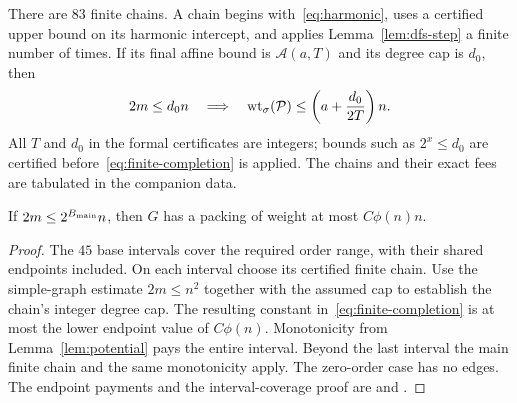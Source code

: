 There are $83$ finite chains. A chain begins with~\eqref{eq:harmonic}, uses
a certified upper bound on its harmonic intercept, and applies
Lemma~\ref{lem:dfs-step} a finite number of times. If its final affine bound
is $\mathcal A(a,T)$ and its degree cap is $d_0$, then
\begin{equation}\label{eq:finite-completion}
       2m\le d_0n\quad\Longrightarrow\quad
       \operatorname{wt}_\sigma(\mathcal P)\le\left(a+\frac{d_0}{2T}\right)n.
\end{equation}
All $T$ and $d_0$ in the formal certificates are integers; bounds such as
$2^x\le d_0$ are certified before~\eqref{eq:finite-completion} is applied.
The chains and their exact fees are tabulated in the companion data.

\begin{proposition}\label{prop:finite-base}
If $2m\le2^{B_{\rm main}}n$, then $G$ has a packing of weight at most
$C\phi(n)n$.
\end{proposition}
\begin{proof}
The $45$ base intervals cover the required order range, with their shared
endpoints included. On each interval choose its certified finite chain.
Use the simple-graph estimate $2m\le n^2$ together with the assumed cap
to establish the chain's integer degree cap. The resulting constant
in~\eqref{eq:finite-completion} is at most the lower endpoint value of
$C\phi(n)$. Monotonicity from Lemma~\ref{lem:potential} pays the entire
interval. Beyond the last interval the main finite chain and the same
monotonicity apply. The zero-order case has no edges. The endpoint payments
and the interval-coverage proof are
 and
.
\end{proof}
